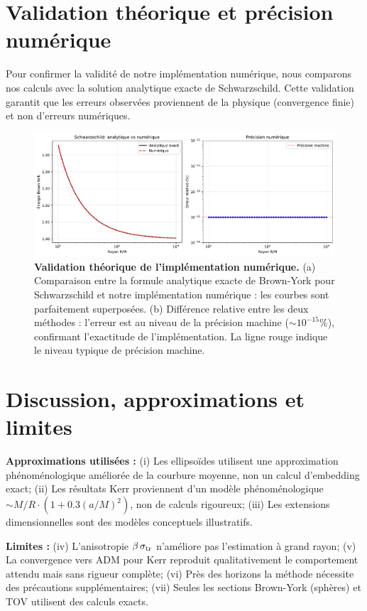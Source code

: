 \documentclass[11pt]{article}
\begin{document}
\section{Validation théorique et précision numérique}

Pour confirmer la validité de notre implémentation numérique, nous comparons nos calculs avec la solution analytique exacte de Schwarzschild. Cette validation garantit que les erreurs observées proviennent de la physique (convergence finie) et non d'erreurs numériques.

\begin{figure}[!htb]
\centering
\includegraphics[width=\linewidth]{fig_theoretical_comparison.pdf}
\caption{\textbf{Validation théorique de l'implémentation numérique.} (a) Comparaison entre la formule analytique exacte de Brown-York pour Schwarzschild et notre implémentation numérique : les courbes sont parfaitement superposées. (b) Différence relative entre les deux méthodes : l'erreur est au niveau de la précision machine ($\sim 10^{-15}\%$), confirmant l'exactitude de l'implémentation. La ligne rouge indique le niveau typique de précision machine.}
\end{figure}

\section{Discussion, approximations et limites}
\textbf{Approximations utilis\'ees :} 
(i) Les ellipso\"ides utilisent une approximation ph\'enom\'enologique am\'elior\'ee de la courbure moyenne, non un calcul d'embedding exact; 
(ii) Les r\'esultats Kerr proviennent d'un mod\`ele ph\'enom\'enologique $\sim M/R \cdot (1 + 0.3(a/M)^2)$, non de calculs rigoureux; 
(iii) Les extensions dimensionnelles sont des mod\`eles conceptuels illustratifs.

\textbf{Limites :} 
(iv) L'anisotropie $\beta\,\sigma_{\rm tr}$ n'am\'eliore pas l'estimation \`a grand rayon; 
(v) La convergence vers ADM pour Kerr reproduit qualitativement le comportement attendu mais sans rigueur compl\`ete; 
(vi) Pr\`es des horizons la m\'ethode n\'ecessite des pr\'ecautions suppl\'ementaires;
(vii) Seules les sections Brown-York (sph\`eres) et TOV utilisent des calculs exacts.
\end{document}
